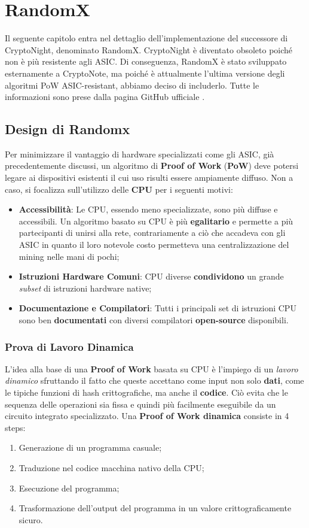 \chapter{RandomX}

Il seguente capitolo entra nel dettaglio dell'implementazione del successore di CryptoNight, denominato RandomX. CryptoNight è diventato obsoleto poiché non è più resistente agli ASIC. Di conseguenza, RandomX è stato sviluppato esternamente a CryptoNote, ma poiché è attualmente l'ultima versione degli algoritmi PoW ASIC-resistant, abbiamo deciso di includerlo. Tutte le informazioni sono prese dalla pagina GitHub ufficiale \cite{randomx}.

\section{Design di Randomx}
Per minimizzare il vantaggio di hardware specializzati come gli ASIC, già precedentemente discussi, un algoritmo di \textbf{Proof of Work} (\textbf{PoW}) deve potersi legare ai dispositivi esistenti il cui uso risulti essere ampiamente diffuso. Non a caso, si focalizza sull'utilizzo delle \textbf{CPU} per i seguenti motivi:

\begin{itemize}
    \item \textbf{Accessibilità}: Le CPU, essendo meno specializzate, sono più diffuse e accessibili. Un algoritmo basato su CPU è più \textbf{egalitario} e permette a più partecipanti di unirsi alla rete, contrariamente a ciò che accadeva con gli ASIC in quanto il loro notevole costo permetteva una centralizzazione del mining nelle mani di pochi;
    \item \textbf{Istruzioni Hardware Comuni}: CPU diverse \textbf{condividono} un grande \textit{subset} di istruzioni hardware native;
    \item \textbf{Documentazione e Compilatori}: Tutti i principali set di istruzioni CPU sono ben \textbf{documentati} con diversi compilatori \textbf{open-source} disponibili.
\end{itemize}

\subsection{Prova di Lavoro Dinamica} 
L'idea alla base di una \textbf{Proof of Work} basata su CPU è l'impiego di un \textit{lavoro dinamico} sfruttando il fatto che queste accettano come input non solo \textbf{dati}, come le tipiche funzioni di hash crittografiche, ma anche il \textbf{codice}. Ciò evita che le sequenza delle operazioni sia fissa e quindi più facilmente eseguibile da un circuito integrato specializzato. Una \textbf{Proof of Work dinamica} consiste in 4 steps:
\begin{enumerate}
    \item Generazione di un programma casuale;
    \item Traduzione nel codice macchina nativo della CPU;
    \item Esecuzione del programma;
    \item Trasformazione dell'output del programma in un valore crittograficamente sicuro.
\end{enumerate}


